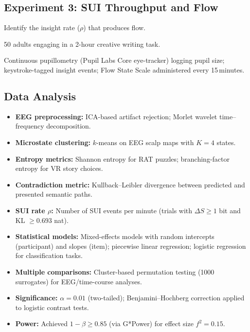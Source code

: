 \documentclass[12pt,a4paper]{article}
\begin{document}
\subsection{Experiment 3: SUI Throughput and Flow}
\begin{description}[style=nextline,leftmargin=2.8cm,labelsep=0.4cm]
  \item[Goal] Identify the insight rate ($\rho$) that produces flow.
  \item[Participants] 50 adults engaging in a 2-hour creative writing task.
  \item[Measures] Continuous pupillometry (Pupil Labs Core eye-tracker) logging pupil size; keystroke-tagged insight events; Flow State Scale administered every 15\,minutes.
\end{description}

\subsection{Data Analysis}
\begin{itemize}[leftmargin=*]
  \item \textbf{EEG preprocessing:} ICA-based artifact rejection; Morlet wavelet time--frequency decomposition.
  \item \textbf{Microstate clustering:} $k$-means on EEG scalp maps with $K=4$ states.
  \item \textbf{Entropy metrics:} Shannon entropy for RAT puzzles; branching-factor entropy for VR story choices.
  \item \textbf{Contradiction metric:} Kullback--Leibler divergence \cite{Kullback1951} between predicted and presented semantic paths.
  \item \textbf{SUI rate $\rho$:} Number of SUI events per minute (trials with $\Delta S \ge 1$ bit and KL $\ge 0.693$ nat).
  \item \textbf{Statistical models:} Mixed-effects models with random intercepts (participant) and slopes (item); piecewise linear regression; logistic regression for classification tasks.
  \item \textbf{Multiple comparisons:} Cluster-based permutation testing (1000 surrogates) for EEG/time-course analyses.
  \item \textbf{Significance:} $\alpha = 0.01$ (two-tailed); Benjamini--Hochberg correction applied to logistic contrast tests.
  \item \textbf{Power:} Achieved $1-\beta \ge 0.85$ (via G*Power) for effect size $f^2 = 0.15$.
\end{itemize}
\end{document}
